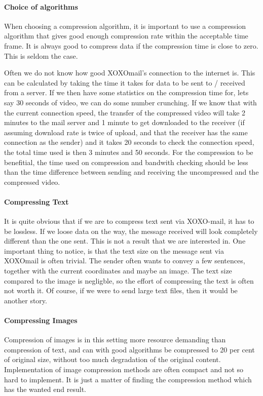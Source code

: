 \paragraph{Choice of algorithms}
When choosing a compression algorithm, it is important to use a compression algorithm that gives good enough compression rate within the acceptable time frame. It is always good to compress data if the compression time is close to zero. This is seldom the case.

Often we do not know how good XOXOmail's connection to the internet is. This can be calculated by taking the time it takes for data to be sent to / received from a server. If we then have some statistics on the compression time for, lets say 30 seconds of video, we can do some number crunching. If we know that with the current connection speed, the transfer of the compressed video will take 2 minutes to the mail server and 1 minute to get downloaded to the receiver (if assuming download rate is twice of upload, and that the receiver has the same connection as the sender) and it takes 20 seconds to check the connection speed, the total time used is then 3 minutes and 50 seconds. For the compression to be benefitial, the time used on compression and bandwith checking should be less than the time difference between sending and receiving the uncompressed and the compressed video.

\paragraph{Compressing Text}
It is quite obvious that if we are to compress text sent via XOXO-mail, it has to be lossless. If we loose data on the way, the message received will look completely different than the one sent. This is not a result that we are interested in. One important thing to notice, is that the text size on the message sent via XOXOmail is often trivial. The sender often wants to convey a few sentences, together with the current coordinates and maybe an image. The text size compared to the image is negligble, so the effort of compressing the text is often not worth it. Of course, if we were to send large text files, then it would be another story.

\paragraph{Compressing Images}
Compression of images is in this setting more resource demanding than compression of text, and can with good algorithms be compressed to 20 per cent of original size, without too much degradation of the original content. Implementation of image compression methods are often compact and not so hard to implement. It is just a matter of finding the compression method which has the wanted end result.


